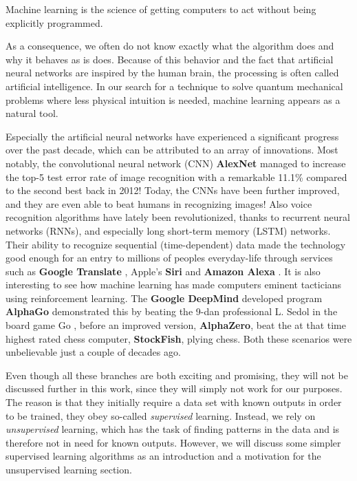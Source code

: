 \begin{shadequote}{}
	Machine learning is the science of getting computers to act without being explicitly programmed.
\end{shadequote}

As a consequence, we often do not know exactly what the algorithm does and why it behaves as is does. Because of this behavior and the fact that artificial neural networks are inspired by the human brain, the processing is often called artificial intelligence. In our search for a technique to solve quantum mechanical problems where less physical intuition is needed, machine learning appears as a natural tool.

Especially the artificial neural networks have experienced a significant progress over the past decade, which can be attributed to an array of innovations. Most notably, the convolutional neural network (CNN) \textbf{AlexNet}  managed to increase the top-5 test error rate of image recognition with a remarkable 11.1\% compared to the second best back in 2012! \cite{krizhevsky_imagenet_2012} Today, the CNNs have been further improved, and they are even able to beat humans in recognizing images! \cite{alom_history_2018} Also voice recognition algorithms have lately been revolutionized, thanks to recurrent neural networks (RNNs), and especially long short-term memory (LSTM) networks. Their ability to recognize sequential (time-dependent) data made the technology good enough for an entry to millions of peoples everyday-life through services such as \textbf{Google Translate} \cite{wu_googles_2016}, Apple's \textbf{Siri} \cite{smith_ios_2016} and \textbf{Amazon Alexa} \cite{noauthor_bringing_nodate}. It is also interesting to see how machine learning has made computers eminent tacticians using reinforcement learning. The \textbf{Google DeepMind} developed program \textbf{AlphaGo} demonstrated this by beating the 9-dan professional L. Sedol in the board game Go \cite{noauthor_alphago_nodate}, before an improved version, \textbf{AlphaZero}, beat the at that time highest rated chess computer, \textbf{StockFish}, plying chess. \cite{klein_mikeklein_googles_nodate} Both these scenarios were unbelievable just a couple of decades ago.

Even though all these branches are both exciting and promising, they will not be discussed further in this work, since they will simply not work for our purposes. The reason is that they initially require a data set with known outputs in order to be trained, they obey so-called \textit{supervised} learning. Instead, we rely on \textit{unsupervised} learning, which has the task of finding patterns in the data and is therefore not in need for known outputs. However, we will discuss some simpler supervised learning algorithms as an introduction and a motivation for the unsupervised learning section.

